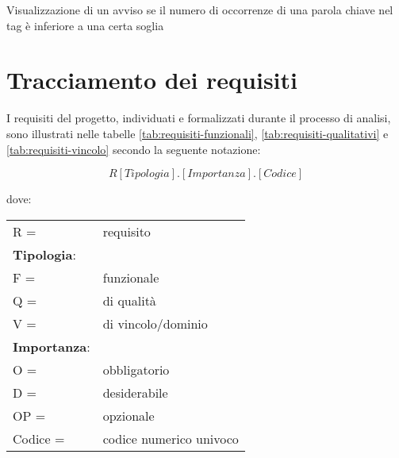 \begin{usecase}{12}{Visualizzazione di un avviso se il numero di occorrenze di una parola chiave nel tag è inferiore a una certa soglia}\label{UC12}
\end{usecase}

\newpage

\section{Tracciamento dei requisiti}
\par I requisiti del progetto, individuati e formalizzati durante il processo di analisi, sono illustrati nelle tabelle \ref{tab:requisiti-funzionali}, \ref{tab:requisiti-qualitativi} e \ref{tab:requisiti-vincolo} secondo la seguente notazione:
\par \textbf{\[R[Tipologia].[Importanza].[Codice]\]} 
\par dove:
\par\vspace{20pt}
\begin{tabular}{@{}ll@{}}
    R = & requisito \\
    \textbf{Tipologia}: & \\
    \quad F = & funzionale \\
    \quad Q = & di qualità \\
    \quad V = & di vincolo/dominio \\
    \textbf{Importanza}: & \\
    \quad O = & obbligatorio \\
    \quad D = & desiderabile \\  
    \quad OP = & opzionale \\
    Codice = & codice numerico univoco \\
\end{tabular}
    
\par\vspace{30pt}

